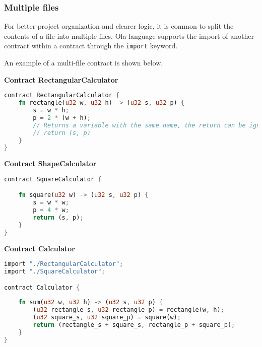 \subsubsection{Multiple files}

For better project organization and clearer logic, it is common to split the contents of a file into multiple files. Ola language supports the import of another contract within a contract through the \verb|import| keyword.

An example of a multi-file contract is shown below.

\textbf{Contract RectangularCalculator}

\begin{lstlisting}[language=rust]
contract RectangularCalculator {
    fn rectangle(u32 w, u32 h) -> (u32 s, u32 p) {
        s = w * h;
        p = 2 * (w + h);
        // Returns a variable with the same name, the return can be ignored
        // return (s, p)
    }
}
\end{lstlisting}

\textbf{Contract ShapeCalculator}

\begin{lstlisting}[language=rust]
contract SquareCalculator {

    fn square(u32 w) -> (u32 s, u32 p) {
        s = w * w;
        p = 4 * w;
        return (s, p);
    }
}
\end{lstlisting}

\textbf{Contract Calculator}

\begin{lstlisting}[language=rust]
import "./RectangularCalculator";
import "./SquareCalculator";

contract Calculator {
  
    fn sum(u32 w, u32 h) -> (u32 s, u32 p) {
        (u32 rectangle_s, u32 rectangle_p) = rectangle(w, h);
        (u32 square_s, u32 square_p) = square(w);
        return (rectangle_s + square_s, rectangle_p + square_p);
    }
}
\end{lstlisting}
